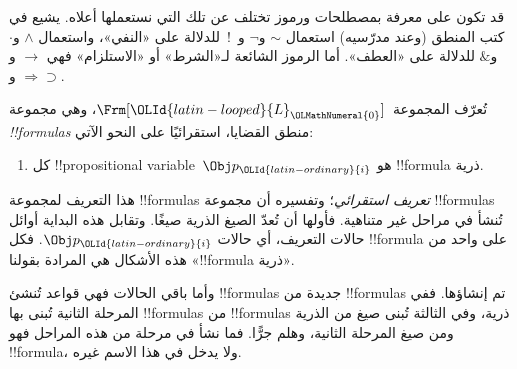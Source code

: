 \documentclass[../../../include/open-logic-section]{subfiles}
\begin{document}
\begin{intro}
قد تكون على معرفة بمصطلحات ورموز تختلف عن تلك التي نستعملها أعلاه. يشيع
في كتب المنطق (وعند مدرّسيه) استعمال $\sim$ و$\neg$ و~!\ للدلالة على
«النفي»، واستعمال $\wedge$ و$\cdot$ و$\&$ للدلالة على «العطف». أما
الرموز الشائعة لـ«الشرط» أو «الاستلزام» فهي $\rightarrow$
و$\Rightarrow$ و$\supset$.
\end{intro}

\begin{defn}[الصيغة]
تُعرّف المجموعة~$\Frm[\OLId{latin-looped}{L}_\OLMathNumeral{0}]$، وهي مجموعة \emph{!!{formula}s} منطق
القضايا، استقرائيًا على النحو الآتي:
\begin{enumerate}


\item كل !!{propositional variable}~$\Obj p_\OLId{latin-ordinary}{i}$ هو !!{formula}
  ذرية.






\end{enumerate}
\end{defn}

\begin{explain}
هذا التعريف لمجموعة !!{formula}s \emph{تعريف استقرائي}؛ وتفسيره أن مجموعة
!!{formula}s تُنشأ في مراحل غير متناهية. فأولها أن تُعدّ الصيغ الذرية صيغًا. وتقابل هذه البداية أوائل حالات التعريف، أي حالات
%
%
$\Obj p_\OLId{latin-ordinary}{i}$. فكل !!{formula} على واحد من هذه الأشكال هي المرادة بقولنا «!!{formula} ذرية».

وأما باقي الحالات فهي قواعد تُنشئ !!{formula}s جديدة من
!!{formula}s تم إنشاؤها. ففي المرحلة الثانية تُبنى بها
!!{formula}s من !!{formula}s ذرية، وفي الثالثة تُبنى صيغ من الذرية ومن صيغ المرحلة الثانية، وهلم جرًّا. فما نشأ في مرحلة من هذه المراحل فهو
!!{formula}، ولا يدخل في هذا الاسم غيره.
\end{explain}
\end{document}
